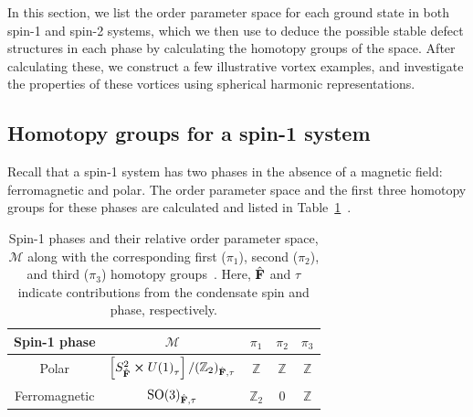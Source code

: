 In this section, we list the order parameter space for each ground state
in both spin-1 and spin-2 systems, which we then use to deduce the possible
stable defect structures in each phase by calculating the homotopy groups of the
space.
After calculating these, we construct a few illustrative vortex examples, and
investigate the properties of these vortices using spherical harmonic
representations.

\subsection{Homotopy groups for a spin-1 system}
Recall that a spin-1 system has two phases in the absence of a magnetic field:
ferromagnetic and polar.
The order parameter space and the first three homotopy groups for these phases
are calculated and listed in
Table~\ref{tab: spin-1-homotopy-groups}~\cite{Mermin1979,Kawaguchi2012,
Kobayashi2012}.
\begin{table}
    \centering
    \begin{tabular}{ccccc}
        \toprule
        Spin-1 phase & \(\mathcal{M}\) & \(\pi_1\) & \(\pi_2\) & \(\pi_3\) \\
        \midrule
        Polar & \(\left[S^2_{\hat{\vb{F}}} \cross {U(1)}_\tau\right]
        / {({\mathbb{Z}}_2)}_{\hat{\vb{F}}, \tau} \)
        & \(\mathbb{Z}\) & \(\mathbb{Z}\)  & \(\mathbb{Z}\) \\
        Ferromagnetic & \({\text{SO}(3)}_{\hat{\vb{F}}, \tau}\)
        & \({\mathbb{Z}}_2\) & 0  & \(\mathbb{Z}\) \\
        \bottomrule
    \end{tabular}
    \caption{\label{tab: spin-1-homotopy-groups}Spin-1 phases and their relative
    order parameter space, \(\mathcal{M}\) along with the corresponding first
    (\(\pi_1\)), second (\(\pi_2\)), and third (\(\pi_3\)) homotopy
    groups~\cite{Kobayashi2012}.
    Here, \(\hat{\vb{F}}\) and \(\tau \) indicate contributions from the
    condensate spin and phase, respectively.}
\end{table}

